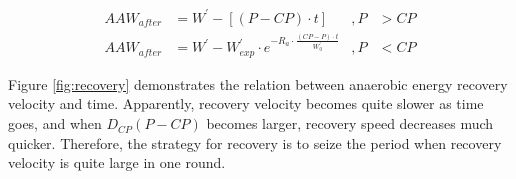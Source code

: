 \documentclass{mcmthesis}
\begin{document}
\begin{align}
    AAW_{after}&=W^\prime-[(P-CP)\cdot t] &, P& >CP\\
     AAW_{after}&=W^\prime-W^\prime_{exp}\cdot  e^{-R_a\cdot \frac{(CP-P)\cdot t}{W^\prime_0}} &, P& <CP
\end{align}
\par
Figure \ref{fig:recovery} demonstrates the relation between anaerobic energy recovery velocity and time. Apparently, recovery velocity becomes quite slower as time goes, and when $D_{CP}(P-CP)$ becomes larger, recovery speed decreases much quicker. Therefore, the strategy for recovery is to seize the period when recovery velocity is quite large in one round.
\end{document}
